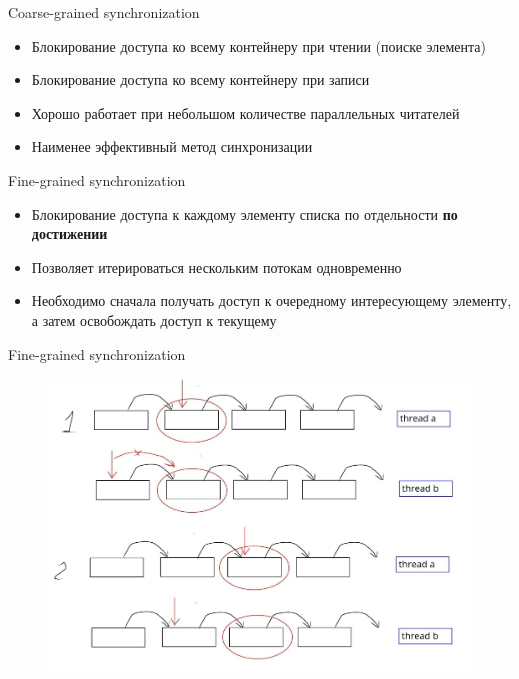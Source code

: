 \documentclass[14pt]{beamer}
\begin{document}
	\begin{frame}{Coarse-grained synchronization}
		\begin{itemize}
			\item Блокирование доступа ко всему контейнеру при чтении (поиске элемента)
			\item Блокирование доступа ко всему контейнеру при записи
			\item Хорошо работает при небольшом количестве параллельных читателей
			\item Наименее эффективный метод синхронизации
		\end{itemize}
	\end{frame}

	\begin{frame}{Fine-grained synchronization}
		\begin{itemize}
			\item Блокирование доступа к каждому элементу списка по отдельности \textbf{по достижении}
			\item Позволяет итерироваться нескольким потокам одновременно
			\item Необходимо сначала получать доступ к очередному интересующему элементу, а затем освобождать доступ к текущему
		\end{itemize}
	\end{frame}

	\begin{frame}{Fine-grained synchronization}
		\begin{figure}
			\includegraphics[scale=0.33]{fine-grained}
		\end{figure}
	\end{frame}
\end{document}
